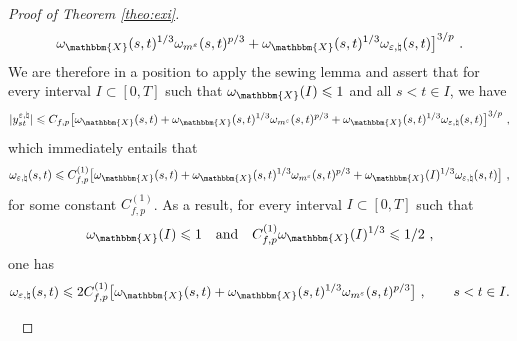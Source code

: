 \documentclass[11pt,reqno,oneside]{amsart}
\numberwithin{equation}{section}
\newcommand{\ep}{\varepsilon}
\begin{document}
\begin{proof}[Proof of Theorem \ref{theo:exi}]
\begin{eqnarray*}
     \omega_{\mathbbm{X}} (s, t)^{1 / 3}  \omega_{m^{\varepsilon}} (s, t)^{p/3} +\omega_{\mathbbm{X}} (s, t)^{1 / 3} \omega_{\varepsilon, \natural} (s,
     t)\big]^{3/p} \ .
		\end{eqnarray*}
We are therefore in a position to apply the sewing lemma and assert that for every interval $I\subset [0,T]$ such that $\omega_{\mathbbm{X}}(I)\leqslant 1$ and all $s<t\in I$, we have
  \[ |  y^{\varepsilon, \natural}_{s t} | \leqslant C_{f,p} \big[\omega_{\mathbbm{X}} (s, t) +
     \omega_{\mathbbm{X}} (s, t)^{1 / 3}  \omega_{m^{\varepsilon}} (s, t)^{p/3} +\omega_{\mathbbm{X}} (s, t)^{1 / 3} \omega_{\varepsilon, \natural} (s,
     t)\big]^{3/p} \ , \]
		which immediately entails that
		$$\omega_{\ep,\natural}(s,t) \leqslant C^{(1)}_{f,p} \big[\omega_{\mathbbm{X}} (s, t) +
     \omega_{\mathbbm{X}} (s, t)^{1 / 3}  \omega_{m^{\varepsilon}} (s, t)^{p/3} +\omega_{\mathbbm{X}} (I)^{1 / 3} \omega_{\varepsilon, \natural} (s,
     t)\big] \ ,$$
		for some constant $C^{(1)}_{f,p}$. As a result, for every interval $I\subset [0,T]$ such that 
  \begin{equation}
   \omega_{\mathbbm{X}}(I)\leqslant 1 \quad \text{and} \quad C^{(1)}_{f,p} \omega_{\mathbbm{X}} (I)^{1 / 3} \leqslant 1/2 \ ,
    \label{eq:I-small}
  \end{equation}
one has
  \begin{equation}
   \omega_{\ep,\natural}(s,t) \leqslant 2 C^{(1)}_{f,p} \big[\omega_{\mathbbm{X}} (s, t) +
     \omega_{\mathbbm{X}} (s, t)^{1 / 3}  \omega_{m^{\varepsilon}} (s, t)^{p/3} \big] \ , \qquad s<t \in I. \label{eq:ysharp-bound}
  \end{equation}
  
	\
  

\end{proof}
\end{document}
